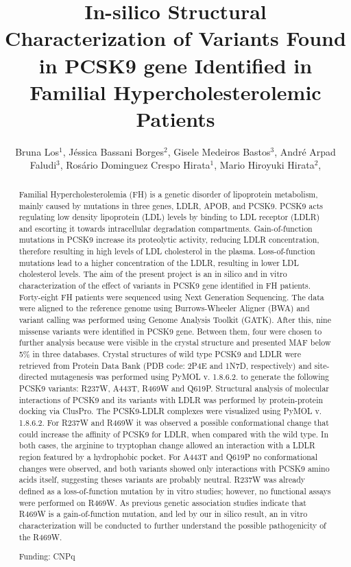 \documentclass[twoside]{article}
\title{\vspace{-15mm}\fontsize{24pt}{10pt}\selectfont\textbf{ In-silico Structural Characterization of Variants Found in PCSK9 gene Identified in Familial Hypercholesterolemic Patients }} %
\author{ Bruna Los$^{1}$, Jéssica Bassani Borges$^{2}$, Gisele Medeiros Bastos$^{3}$, André Arpad Faludi$^{3}$, Rosário Dominguez Crespo Hirata$^{1}$, Mario Hiroyuki Hirata$^{2}$, }
\affil{ 1 Faculty of Pharmaceutical Sciences - University of São Paulo

2 Faculty of Pharmaceutical Sciences - University of São Paulo and Dante Pazzanese Institute of Cardiology

3 Dante Pazzanese Institute of Cardiology

 }
\date{}
\begin{document}
  
  
  \maketitle %
  
  
  \thispagestyle{fancy} %
  
  
  \begin{abstract}
  Familial Hypercholesterolemia (FH) is a genetic disorder of lipoprotein metabolism, mainly caused by mutations in three genes, LDLR, APOB, and PCSK9. PCSK9 acts regulating low density lipoprotein (LDL) levels by binding to LDL receptor (LDLR) and escorting it towards intracellular degradation compartments. Gain-of-function mutations in PCSK9 increase its proteolytic activity, reducing LDLR concentration, therefore resulting in high levels of LDL cholesterol in the plasma. Loss-of-function mutations lead to a higher concentration of the LDLR, resulting in lower LDL cholesterol levels. The aim of the present project is an in silico and in vitro characterization of the effect of variants in PCSK9 gene identified in FH patients. Forty-eight FH patients were sequenced using Next Generation Sequencing. The data were aligned to the reference genome using Burrows-Wheeler Aligner (BWA) and variant calling was performed using Genome Analysis Toolkit (GATK). After this, nine missense variants were identified in PCSK9 gene. Between them, four were chosen to further analysis because were visible in the crystal structure and presented MAF below 5\% in three databases. Crystal structures of wild type PCSK9 and LDLR were retrieved from Protein Data Bank (PDB code: 2P4E and 1N7D, respectively) and site-directed mutagenesis was performed using PyMOL v. 1.8.6.2. to generate the following PCSK9 variants: R237W, A443T, R469W and Q619P. Structural analysis of molecular interactions of PCSK9 and its variants with LDLR was performed by protein-protein docking via ClusPro. The PCSK9-LDLR complexes were visualized using PyMOL v. 1.8.6.2.  For R237W and R469W it was observed a possible conformational change that could increase the affinity of PCSK9 for LDLR, when compared with the wild type. In both cases, the arginine to tryptophan change allowed an interaction with a LDLR region featured by a hydrophobic pocket. For A443T and Q619P no conformational changes were observed, and both variants showed only interactions with PCSK9 amino acids itself, suggesting theses variants are probably neutral. R237W was already defined as a loss-of-function mutation by in vitro studies; however, no functional assays were performed on R469W. As previous genetic association studies indicate that R469W is a gain-of-function mutation, and led by our in silico result, an in vitro characterization will be conducted to further understand the possible pathogenicity of the R469W.
  
  Funding: CNPq \\ 
  \end{abstract}
  
\end{document}
